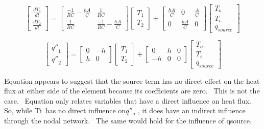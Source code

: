 \begin{equation}
\left[ {\begin{array}{*{20}{c}}{\frac{{d{T_1}}}{{dt}}}\\ {\frac{{d{T_2}}}{{dt}}}\end{array}} \right] = \left[ {\begin{array}{*{20}{c}}{\frac{{ - 1}}{{RC}} - \frac{{hA}}{C}}&{\frac{1}{{RC}}}\\ {\frac{1}{{RC}}}&{\frac{{ - 1}}{{RC}} - \frac{{hA}}{C}}\end{array}} \right]\left[ {\begin{array}{*{20}{c}}{{T_1}}\\ {{T_2}}\end{array}} \right] + \left[ {\begin{array}{*{20}{c}}{\frac{{hA}}{C}}&0&{\frac{A}{C}}\\0&{\frac{{hA}}{C}}&0\end{array}} \right]\left[ {\begin{array}{*{20}{c}}{{T_o}}\\ {{T_i}}\\ {{q_{source}}}\end{array}} \right]
\end{equation}

\begin{equation}
\left[ {\begin{array}{*{20}{c}}{{{q''}_1}}\\ {{{q''}_2}}\end{array}} \right] = \left[ {\begin{array}{*{20}{c}}0&{ - h}\\h&0\end{array}} \right]\left[ {\begin{array}{*{20}{c}}{{T_1}}\\ {{T_2}}\end{array}} \right] + \left[ {\begin{array}{*{20}{c}}0&h&0\\ { - h}&0&0\end{array}} \right]\left[ {\begin{array}{*{20}{c}}{{T_o}}\\ {{T_i}}\\ {{q_{source}}}\end{array}} \right]
\end{equation}

Equation appears to suggest that the source term has no direct effect on the heat flux at either side of the element because its coefficients are zero.~ This is not the case.~ Equation only relates variables that have a direct influence on heat flux.~ So, while Ti~has no direct influence on\({q''_o}\) , it does have an indirect influence through the nodal network.~ The same would hold for the influence of qsource.

